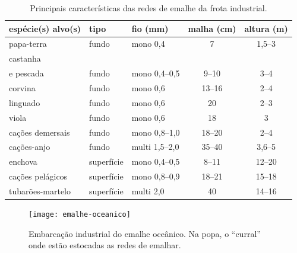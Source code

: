 \documentclass[a4paper,11pt,twoside,showtrims,onecolumn,openright,final]{memoir}
\begin{document}
\begin{table}
\caption[Principais características das redes de emalhe da frota industrial.]
        {Principais características das redes de emalhe da frota industrial.}
\label{tab:emalheindustrial-malhas}
\begin{center}
\begin{tabular*}{\textwidth}{l@{\extracolsep{\fill}}llcc}
\toprule
espécie(s) alvo(s)	& tipo	& fio (mm)		& malha (cm)	& altura (m)	\\ %
\midrule
papa-terra		& fundo	& mono 0,4		& 7		& 1,5--3	\\ %
castanha 		&	&			&		&		\\ %
e pescada		& fundo	& mono 0,4--0,5		& 9--10		& 3--4		\\ %
corvina			& fundo	& mono 0,6		& 13--16	& 2--4		\\ %
linguado		& fundo	& mono 0,6		& 20		& 2--3		\\ %
viola			& fundo	& mono 0,6		& 18		& 3		\\ %
cações demersais	& fundo	& mono 0,8--1,0		& 18--20	& 2--4		\\ %
cações-anjo		& fundo	& multi 1,5--2,0	& 35--40	& 3,6--5	\\ %
enchova			& superfície	& mono 0,4--0,5		& 8--11		& 12--20	\\ %
cações pelágicos	& superfície	& mono 0,8--0,9		& 18--21	& 15--18	\\ %
tubarões-martelo	& superfície	& multi 2,0		& 40		& 14--16	\\ %
\bottomrule
\end{tabular*}
\end{center}
\end{table}


\begin{figure}
\begin{center}
\texttt{[image: emalhe-oceanico]}
\end{center}
\caption[Embarcação industrial do emalhe oceânico]
        {Embarcação industrial do emalhe oceânico. 
         Na popa, o ``curral'' onde estão estocadas as redes de emalhar.}
\label{fig:embarcacao-emalhe-oceanico}
\end{figure}
\end{document}
